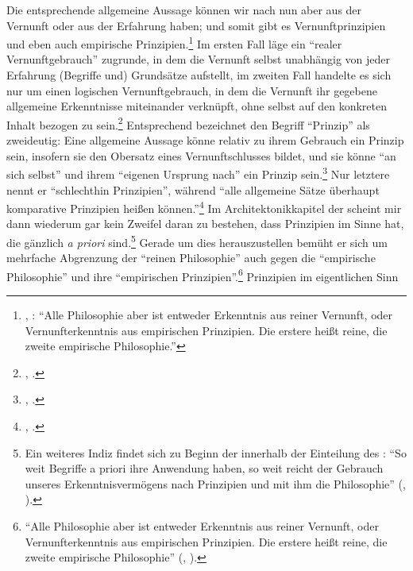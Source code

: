 Die entsprechende allgemeine Aussage können wir nach  nun
aber aus der Vernunft oder aus der Erfahrung haben; und somit gibt es 
Vernunftprinzipien und eben auch empirische
Prinzipien.\footnote{\cite[Vgl.][B~868]{Kant:KritikderreinenVernunft2003},
\cite[][III: 543.24--26]{Kant:GesammelteWerke1900ff.}: \enquote{Alle Philosophie
aber ist entweder Erkenntnis aus reiner Vernunft, oder Vernunfterkenntnis aus
empirischen Prinzipien. Die erstere heißt reine, die zweite empirische
Philosophie.}} Im ersten Fall läge ein \enquote{realer Vernunftgebrauch}
zugrunde, in dem die Vernunft selbst unabhängig von jeder Erfahrung (Begriffe
und) Grundsätze aufstellt, im zweiten Fall handelte es sich nur um einen
logischen Vernunftgebrauch, in dem die Vernunft ihr gegebene allgemeine
Erkenntnisse miteinander verknüpft, ohne selbst auf den konkreten Inhalt bezogen
zu sein.\footnote{\cite[Vgl.][B 355]{Kant:KritikderreinenVernunft2003},
\cite[][III: 237.26--30]{Kant:GesammelteWerke1900ff.}.} Entsprechend bezeichnet
 den Begriff \enquote{Prinzip} als zweideutig:
Eine allgemeine Aussage könne relativ zu ihrem Gebrauch ein Prinzip sein,
insofern sie den Obersatz eines Vernunftschlusses bildet, und sie könne
\enquote{an sich selbst} und ihrem \enquote{eigenen Ursprung nach} ein Prinzip
sein.\footnote{\Cite[Vgl.][B 356]{Kant:KritikderreinenVernunft2003},
\cite[][III: 238.12--15]{Kant:GesammelteWerke1900ff.}.} Nur letztere nennt er
\enquote{schlechthin Prinzipien}, während \enquote{alle allgemeine Sätze
überhaupt komparative Prinzipien heißen
können.}\footnote{\Cite[][B~358]{Kant:KritikderreinenVernunft2003}, \cite[][III:
359.7--8]{Kant:GesammelteWerke1900ff.}.} Im Architektonikkapitel der
 scheint mir dann wiederum gar kein Zweifel
daran zu bestehen, dass  Prinzipien im Sinne hat, die
gänzlich \emph{a priori} sind.\footnote{Ein weiteres Indiz findet sich zu Beginn
der  innerhalb der Einteilung des
:
\enquote{So weit Begriffe a priori ihre Anwendung haben, so weit reicht der
Gebrauch unseres Erkenntnisvermögens nach Prinzipien und mit ihm die
Philosophie} \mkbibparens{\cite[][xvi]{Kant:KritikderUrteilskraft2009},
\cite[][V: 174.3--5]{Kant:GesammelteWerke1900ff.}}.} Gerade um dies
herauszustellen bemüht er sich um mehrfache Abgrenzung der \enquote{reinen Philosophie} auch gegen die
\enquote{empirische Philosophie} und ihre \enquote{empirischen
Prinzipien}.\footnote{\enquote{Alle Philosophie aber ist entweder Erkenntnis aus
reiner Vernunft, oder Vernunfterkenntnis aus empirischen Prinzipien. Die erstere
heißt reine, die zweite empirische Philosophie} \mkbibparens{\cite[][B
868]{Kant:KritikderreinenVernunft2003}, \cite[][III:
543.24--26]{Kant:GesammelteWerke1900ff.}}.} Prinzipien im eigentlichen Sinn
